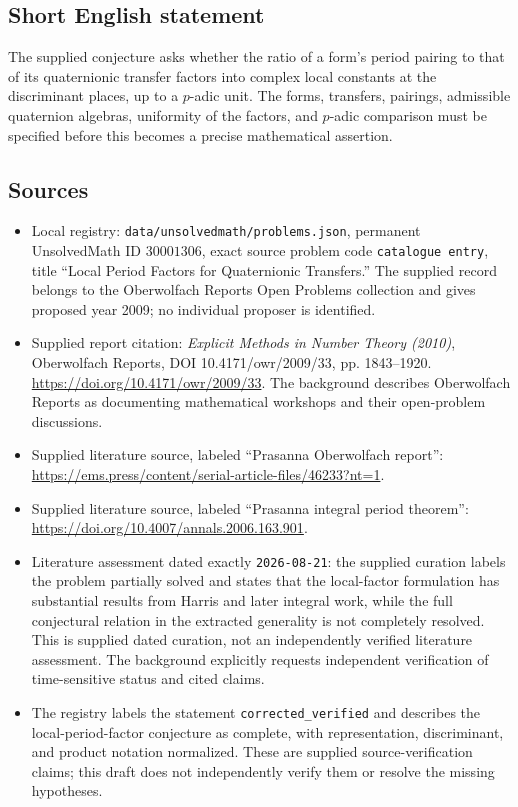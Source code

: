 \documentclass[11pt]{article}
\begin{document}
\subsection{Short English statement}
The supplied conjecture asks whether the ratio of a form's period pairing to that of its quaternionic transfer factors into complex local constants at the discriminant places, up to a \(p\)-adic unit. The forms, transfers, pairings, admissible quaternion algebras, uniformity of the factors, and \(p\)-adic comparison must be specified before this becomes a precise mathematical assertion.
\subsection{Sources}
\begin{itemize}
\item Local registry: \texttt{data/unsolvedmath/problems.json}, permanent UnsolvedMath ID \(30001306\), exact source problem code \texttt{catalogue entry}, title ``Local Period Factors for Quaternionic Transfers.'' The supplied record belongs to the Oberwolfach Reports Open Problems collection and gives proposed year 2009; no individual proposer is identified.
\item Supplied report citation: \emph{Explicit Methods in Number Theory (2010)}, Oberwolfach Reports, DOI 10.4171/owr/2009/33, pp. 1843--1920. \url{https://doi.org/10.4171/owr/2009/33}. The background describes Oberwolfach Reports as documenting mathematical workshops and their open-problem discussions.
\item Supplied literature source, labeled ``Prasanna Oberwolfach report'': \url{https://ems.press/content/serial-article-files/46233?nt=1}.
\item Supplied literature source, labeled ``Prasanna integral period theorem'': \url{https://doi.org/10.4007/annals.2006.163.901}.
\item Literature assessment dated exactly \texttt{2026-08-21}: the supplied curation labels the problem partially solved and states that the local-factor formulation has substantial results from Harris and later integral work, while the full conjectural relation in the extracted generality is not completely resolved. This is supplied dated curation, not an independently verified literature assessment. The background explicitly requests independent verification of time-sensitive status and cited claims.
\item The registry labels the statement \texttt{corrected\_verified} and describes the local-period-factor conjecture as complete, with representation, discriminant, and product notation normalized. These are supplied source-verification claims; this draft does not independently verify them or resolve the missing hypotheses.
\end{itemize}
\end{document}
